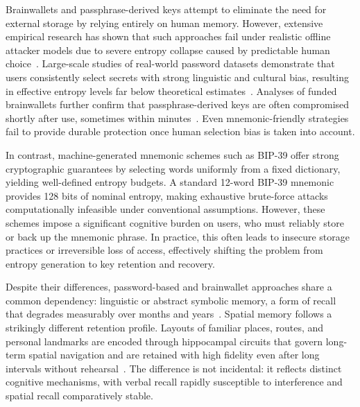 \documentclass[mathematics,article,accept,pdftex,moreauthors]{Definitions/mdpi}
\begin{document}
Brainwallets and passphrase-derived keys attempt to eliminate the need for external storage by relying entirely on human memory. However, extensive empirical research has shown that such approaches fail under realistic offline attacker models due to severe entropy collapse caused by predictable human choice~\cite{Bonneau2012,Vasek2017}. Large-scale studies of real-world password datasets demonstrate that users consistently select secrets with strong linguistic and cultural bias, resulting in effective entropy levels far below theoretical estimates~\cite{Bonneau2012,Kuo2006}. Analyses of funded brainwallets further confirm that passphrase-derived keys are often compromised shortly after use, sometimes within minutes~\cite{Vasek2017,Yang2016}. Even mnemonic-friendly strategies fail to provide durable protection once human selection bias is taken into account.

In contrast, machine-generated mnemonic schemes such as BIP-39 offer strong cryptographic guarantees by selecting words uniformly from a fixed dictionary, yielding well-defined entropy budgets. A standard 12-word BIP-39 mnemonic provides 128 bits of nominal entropy, making exhaustive brute-force attacks computationally infeasible under conventional assumptions. However, these schemes impose a significant cognitive burden on users, who must reliably store or back up the mnemonic phrase. In practice, this often leads to insecure storage practices or irreversible loss of access, effectively shifting the problem from entropy generation to key retention and recovery.

{Despite their differences, password-based and brainwallet approaches share a common dependency: linguistic or abstract symbolic memory, a form of recall that degrades measurably over months and years~\cite{Pals2018,Akaygun2014}. Spatial memory follows a strikingly different retention profile. Layouts of familiar places, routes, and personal landmarks are encoded through hippocampal circuits that govern long-term spatial navigation and are retained with high fidelity even after long intervals without rehearsal~\cite{Montello1998,McNamara2003,McNamara2012,McNaughton1991}. The difference is not incidental: it reflects distinct cognitive mechanisms, with verbal recall rapidly susceptible to interference and spatial recall comparatively stable.}
\end{document}
